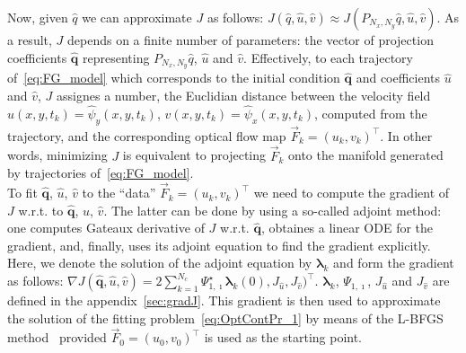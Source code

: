 \documentclass[onecolumn, 12pt, conference]{ieeeconf}
\def\F{\vec{F}}
\newcommand{\Lt}{L^2(\Omega)}
\begin{document}
Now, given $\hat q$ we can approximate $J$ as follows: $J(\hat q,\hat u,\hat v)\approx J(P_{N_x,N_y}\hat q,\hat u,\hat v)$. As a result, $J$ depends on a finite number of parameters: the vector of projection coefficients $\hat{\bm q}$ representing $P_{N_x,N_y}\hat q$, $\hat u$ and $\hat v$. Effectively, to each trajectory of~\eqref{eq:FG_model} which corresponds to the initial condition $\hat{\bm q}$ and coefficients $\hat u$ and $\hat v$, $J$ assignes a number, the Euclidian distance between the velocity field $u(x,y,t_k)=\hat\psi_y(x,y,t_k)$, $v(x,y,t_k) = \hat\psi_x(x,y,t_k)$, computed from the trajectory, and the corresponding optical flow map $\F_k=(u_k,v_k)^\top$. In other words, minimizing $J$ is equivalent to projecting $\F_k$ onto the manifold generated by trajectories of~\eqref{eq:FG_model}.\\
To fit $\hat{\bm q}$, $\hat u$, $\hat v$ to the ``data'' $\F_k=(u_k,v_k)^\top$ we need to compute the gradient of $J$ w.r.t. to $\hat{\bm q}$, $\hat u$, $\hat v$. The latter can be done by using a so-called adjoint method: one computes Gateaux derivative of $J$ w.r.t. $\hat{\bm q}$, obtaines a linear ODE for the gradient, and, finally, uses its adjoint equation to find the gradient explicitly. Here, we denote the solution of the adjoint equation by $\bm{\lambda}_k$ and form the gradient as follows: $\nabla J(\hat{\bm q},\hat u,\hat v)=2\sum_{k=1}^{N_c}\Psi_{1,\imath}^\star\bm{\lambda}_k(0),J_{\hat u},J_{\hat v})^\top$. $\bm{\lambda}_k$, $\Psi_{1,\imath}$, $J_{\hat u}$ and $J_{\hat v}$ are defined in the appendix~\ref{sec:gradJ}. This gradient is then used to approximate the solution of the fitting problem~\eqref{eq:OptContPr_1} by means of the L-BFGS method~\cite{L_BFGS} provided $\F_0=(u_0,v_0)^\top$ is used as the starting point.
\end{document}
